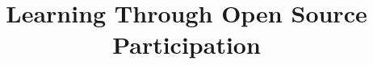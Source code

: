 \documentclass{sig-alternate}
\begin{document}
%

\title{Learning Through Open Source Participation}

%
%
%
%
%

        
\end{document}
